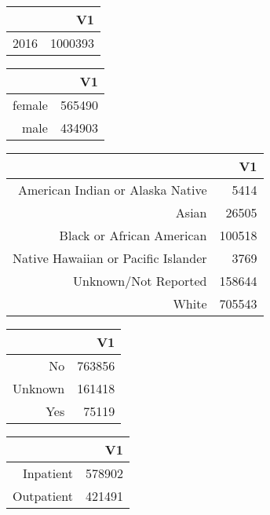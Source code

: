 \bigskip\bigskip
\centering
\begin{tabular}{rr}
  \hline
 & V1 \\ 
  \hline
2016 & 1000393 \\ 
   \hline
\end{tabular}

\bigskip\bigskip
\centering
\begin{tabular}{rr}
  \hline
 & V1 \\ 
  \hline
female & 565490 \\ 
  male & 434903 \\ 
   \hline
\end{tabular}

\bigskip\bigskip
\centering
\begin{tabular}{rr}
  \hline
 & V1 \\ 
  \hline
American Indian or Alaska Native & 5414 \\ 
  Asian & 26505 \\ 
  Black or African American & 100518 \\ 
  Native Hawaiian or Pacific Islander & 3769 \\ 
  Unknown/Not Reported & 158644 \\ 
  White & 705543 \\ 
   \hline
\end{tabular}

\bigskip\bigskip
\centering
\begin{tabular}{rr}
  \hline
 & V1 \\ 
  \hline
No & 763856 \\ 
  Unknown & 161418 \\ 
  Yes & 75119 \\ 
   \hline
\end{tabular}

\bigskip\bigskip
\centering
\begin{tabular}{rr}
  \hline
 & V1 \\ 
  \hline
Inpatient & 578902 \\ 
  Outpatient & 421491 \\ 
   \hline
\end{tabular}

